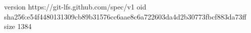 version https://git-lfs.github.com/spec/v1
oid sha256:e54f4480131309cb89b31576cc6aae8c6a722603da4d2b30773fbcf883da73ff
size 1384
